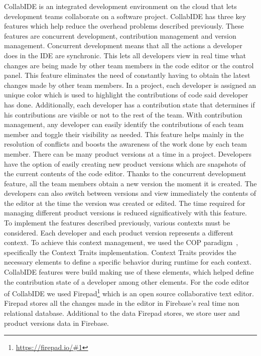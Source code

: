 \documentclass[draft]{llncs}
\begin{document}
CollabIDE is an integrated development environment on the cloud that lets development teams 
collaborate on a software project. CollabIDE has three key features which help reduce the overhead 
problems described previously. These features are concurrent development, contribution management 
and version management.
Concurrent development means that all the actions a developer does in the IDE are synchronic. This 
lets all developers view in real time what changes are being made by other team members in the code 
editor or the control panel. This feature eliminates the need of constantly having to obtain the latest 
changes made by other team members. 
In a project, each developer is assigned an unique color which is used to highlight the contributions of 
code said developer has done. Additionally, each developer has a contribution state that determines if 
his contributions are visible or not to the rest of the team. With contribution management, any 
developer can easily identify the contributions of each team member and toggle their visibility as 
needed. This feature helps mainly in the resolution of conflicts and boosts the awareness of the work 
done by each team member.
There can be many product versions at a time in a project. Developers have the option of easily 
creating new product versions which are snapshots of the current contents of the code editor. Thanks 
to the concurrent development feature, all the team members obtain a new version the moment it is 
created. The developers can also switch between versions and view immediately the contents of the 
editor at the time the version was created or edited. The time required for managing different product 
versions is reduced significatively with this feature.
To implement the features described previously, various contexts must be considered. Each developer 
and each product version represents a different context. To achieve this context management, we used 
the \ac{COP} paradigm~\cite{salvaneschi+12survey}, specifically the Context Traits implementation. 
Context Traits provides the necessary elements to define a specific behavior during runtime for each 
context. CollabIDE features were build making use of these elements, which helped define the 
contribution state of a developer among other elements.
For the code editor of CollabIDE we used Firepad\footnote{\url{https://firepad.io/\#1}} which is an open 
source collaborative text editor. Firepad stores all the changes made in the editor in Firebase’s real 
time non relational database. Additional to the data Firepad stores, we store user and product versions 
data in Firebase.
\end{document}
